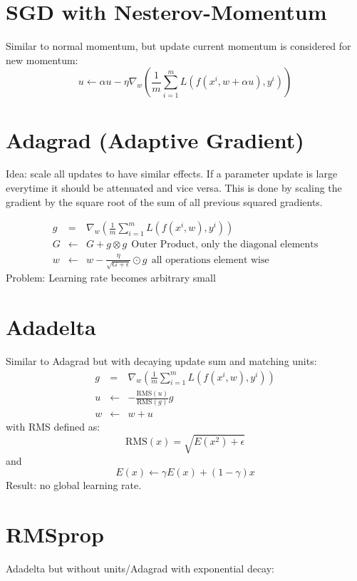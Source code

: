 \section{SGD with Nesterov-Momentum}
Similar to normal momentum, but update current momentum is considered for new momentum:
\begin{equation}
    u \leftarrow \alpha u - \eta \nabla_w \left( \frac{1}{m} \sum_{i=1}^m L(f(x^i, w + \alpha u), y^i)\right)
\end{equation}

\section{Adagrad (Adaptive Gradient)}
Idea: scale all updates to have similar effects. If a parameter update
is large everytime it should be attenuated and vice versa. This is done
by scaling the gradient by the square root of the sum of all previous squared gradients.

\begin{eqnarray}
    g &=& \nabla_w \left( \frac{1}{m} \sum_{i=1}^m L(f(x^i, w), y^i) \right) \\
    G &\leftarrow& G + g \otimes g\ \ \text{Outer Product, only the diagonal elements} \\
    w &\leftarrow& w - \frac{\eta}{\sqrt{G + \epsilon}} \odot g\ \ \text{all operations element wise}
\end{eqnarray}
Problem: Learning rate becomes arbitrary small

\section{Adadelta}
Similar to Adagrad but with decaying update sum and matching units:
\begin{eqnarray}
    g &=& \nabla_w \left( \frac{1}{m} \sum_{i=1}^m L(f(x^i, w), y^i) \right) \\
    u &\leftarrow& -\frac{\text{RMS}(u)}{\text{RMS}(g)} g \\
    w &\leftarrow& w + u
\end{eqnarray}
with RMS defined as:
\begin{equation}
    \text{RMS}(x) = \sqrt{E(x^2) + \epsilon}
\end{equation}
and
\begin{equation}
    E(x) \leftarrow \gamma E(x) + (1-\gamma) x
\end{equation}
Result: no global learning rate.

\section{RMSprop}
Adadelta but without units/Adagrad with exponential decay:

